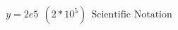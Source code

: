 \documentclass[preview]{standalone}
\begin{document}
\begin{align*}
y = 2e5\:\:(2 * 10^5)\:\:\text{Scientific Notation}
\end{align*}
\end{document}
